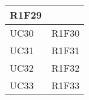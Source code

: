 \begin{center}
\begin{longtable}{|p{44mm}|p{22mm}|}
R1F29 \newline
\\
\hline
UC30 &

R1F30 \newline
\\
\hline
UC31 &

R1F31 \newline
\\
\hline
UC32 &

R1F32 \newline
\\
\hline
UC33 &

R1F33 \newline
\\
\hline%

	\end{longtable}
\end{center}

